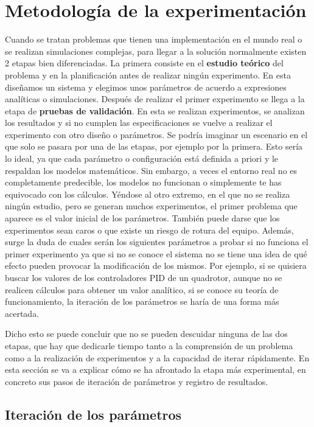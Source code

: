 \section{Metodología de la experimentación} 
Cuando se tratan problemas que tienen una implementación en el mundo real o se realizan simulaciones complejas, para llegar a la solución normalmente existen 2 etapas bien diferenciadas. La primera consiste en el \textbf{estudio teórico} del problema y en la planificación antes de realizar ningún experimento. En esta diseñamos un sistema y elegimos unos parámetros de acuerdo a expresiones analíticas o simulaciones. Después de realizar el primer experimento se llega a la etapa de \textbf{pruebas de validación}. En esta se realizan experimentos, se analizan los resultados y si no cumplen las especificaciones se vuelve a realizar el experimento con otro diseño o parámetros.    
Se podría imaginar un escenario en el que solo se pasara por una de las etapas, por ejemplo por la primera. Esto sería lo ideal, ya que cada parámetro o configuración está definida a priori y le respaldan los modelos matemáticos. Sin embargo, a veces el entorno real no es completamente predecible, los modelos no funcionan o simplemente te has equivocado con los cálculos. 
Yéndose al otro extremo, en el que no se realiza ningún estudio, pero se generan muchos experimentos, el primer problema que aparece es el valor inicial de los parámetros. También  puede darse que los experimentos sean caros o que existe un riesgo de rotura del equipo. Además, surge la duda de cuales serán los siguientes parámetros a probar si no funciona el primer experimento ya que si no se conoce el sistema no se tiene una idea de qué efecto pueden provocar la modificación de los mismos. 
Por ejemplo, si se quisiera buscar los valores de los controladores PID de un quadrotor, aunque no se realicen cálculos para obtener un valor analítico, si se conoce su teoría de funcionamiento, la iteración de los parámetros se haría de una forma más acertada.

Dicho esto se puede concluir que no se pueden descuidar ninguna de las dos etapas, que hay que dedicarle tiempo tanto a la comprensión de un problema como a la realización de experimentos y a la capacidad de iterar rápidamente. En esta sección se va a explicar cómo se ha afrontado la etapa más experimental, en concreto sus pasos de iteración de parámetros y registro de resultados.


\subsection{Iteración de los parámetros}

